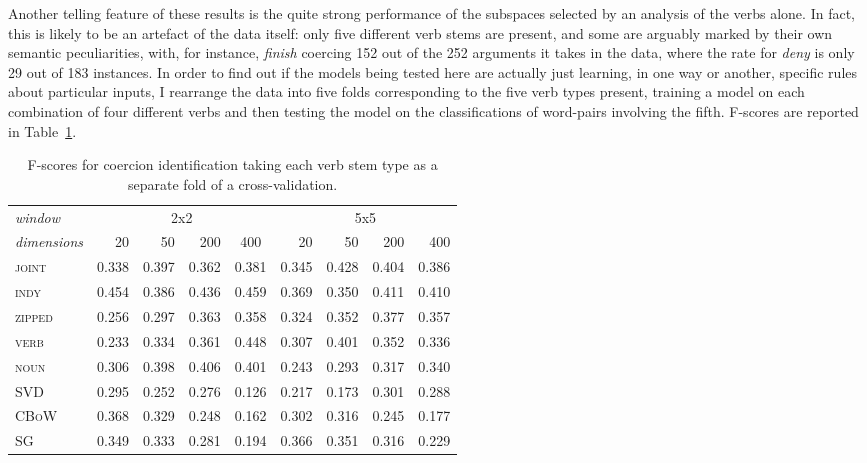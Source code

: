 Another telling feature of these results is the quite strong performance of the subspaces selected by an analysis of the verbs alone.  In fact, this is likely to be an artefact of the data itself: only five different verb stems are present, and some are arguably marked by their own semantic peculiarities, with, for instance, \emph{finish} coercing 152 out of the 252 arguments it takes in the data, where the rate for \emph{deny} is only 29 out of 183 instances.  In order to find out if the models being tested here are actually just learning, in one way or another, specific rules about particular inputs, I rearrange the data into five folds corresponding to the five verb types present, training a model on each combination of four different verbs and then testing the model on the classifications of word-pairs involving the fifth.  F-scores are reported in Table~\ref{tab:verb-coercion}.

\begin{table}
\centering
\begin{tabular}{lrrrr|rrrr}
\hline
\emph{window} & \multicolumn{4}{c}{2x2} & \multicolumn{4}{c}{5x5} \\
\emph{dimensions} & 20 & 50 & 200 & \multicolumn{1}{c}{400} & 20 & 50 & 200 & 400 \\
\hline
\textsc{joint} & 0.338 & 0.397 & 0.362 & 0.381 & 0.345 & 0.428 & 0.404 & 0.386 \\
\textsc{indy} & 0.454 & 0.386 & 0.436 & 0.459 & 0.369 & 0.350 & 0.411 & 0.410 \\
\textsc{zipped} & 0.256 & 0.297 & 0.363 & 0.358 & 0.324 & 0.352 & 0.377 & 0.357 \\
\textsc{verb} & 0.233 & 0.334 & 0.361 & 0.448 & 0.307 & 0.401 & 0.352 & 0.336 \\
\textsc{noun} & 0.306 & 0.398 & 0.406 & 0.401 & 0.243 & 0.293 & 0.317 & 0.340 \\
\textsc{SVD} & 0.295 & 0.252 & 0.276 & 0.126 & 0.217 & 0.173 & 0.301 & 0.288 \\
\textsc{CBoW} & 0.368 & 0.329 & 0.248 & 0.162 & 0.302 & 0.316 & 0.245 & 0.177 \\
\textsc{SG} & 0.349 & 0.333 & 0.281 & 0.194 & 0.366 & 0.351 & 0.316 & 0.229 \\
\hline
\end{tabular}
\caption[F-Scores for Coercion Classification Testing on Unseen Verbs]{F-scores for coercion identification taking each verb stem type as a separate fold of a cross-validation.}
\label{tab:verb-coercion}
\end{table}

